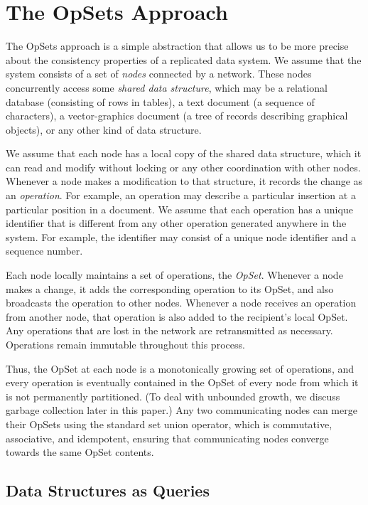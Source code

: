 \section{The OpSets Approach}\label{sec:approach}

The OpSets approach is a simple abstraction that allows us to be more precise about the consistency properties of a replicated data system.
We assume that the system consists of a set of \emph{nodes} connected by a network.
These nodes concurrently access some \emph{shared data structure}, which may be a relational database (consisting of rows in tables), a text document (a sequence of characters), a vector-graphics document (a tree of records describing graphical objects), or any other kind of data structure.

We assume that each node has a local copy of the shared data structure, which it can read and modify without locking or any other coordination with other nodes.
Whenever a node makes a modification to that structure, it records the change as an \emph{operation}.
For example, an operation may describe a particular insertion at a particular position in a document.
We assume that each operation has a unique identifier that is different from any other operation generated anywhere in the system.
For example, the identifier may consist of a unique node identifier and a sequence number.

Each node locally maintains a set of operations, the \emph{OpSet}.
Whenever a node makes a change, it adds the corresponding operation to its OpSet, and also broadcasts the operation to other nodes.
Whenever a node receives an operation from another node, that operation is also added to the recipient's local OpSet.
Any operations that are lost in the network are retransmitted as necessary.
Operations remain immutable throughout this process.

Thus, the OpSet at each node is a monotonically growing set of operations, and every operation is eventually contained in the OpSet of every node from which it is not permanently partitioned.
(To deal with unbounded growth, we discuss garbage collection later in this paper.)
Any two communicating nodes can merge their OpSets using the standard set union operator, which is commutative, associative, and idempotent, ensuring that communicating nodes converge towards the same OpSet contents.

\subsection{Data Structures as Queries}\label{sec:queries}

